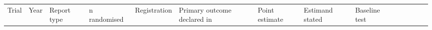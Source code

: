 {\def\LTcaptype{none} %
\begin{longtable}[]{@{}
  >{\raggedright\arraybackslash}p{}
  >{\raggedright\arraybackslash}p{}
  >{\raggedright\arraybackslash}p{}
  >{\raggedleft\arraybackslash}p{}
  >{\raggedright\arraybackslash}p{}
  >{\raggedright\arraybackslash}p{}
  >{\raggedright\arraybackslash}p{}
  >{\raggedright\arraybackslash}p{}
  >{\raggedright\arraybackslash}p{}
  >{\raggedright\arraybackslash}p{}
  >{\raggedright\arraybackslash}p{}
  >{\raggedright\arraybackslash}p{}
  >{\raggedright\arraybackslash}p{}
  >{\raggedright\arraybackslash}p{}@{}}
\toprule\noalign{}
\begin{minipage}[b]{\linewidth}\raggedright
Trial
\end{minipage} & \begin{minipage}[b]{\linewidth}\raggedright
Year
\end{minipage} & \begin{minipage}[b]{\linewidth}\raggedright
Report type
\end{minipage} & \begin{minipage}[b]{\linewidth}\raggedleft
n randomised
\end{minipage} & \begin{minipage}[b]{\linewidth}\raggedright
Registration
\end{minipage} & \begin{minipage}[b]{\linewidth}\raggedright
Primary outcome declared in
\end{minipage} & \begin{minipage}[b]{\linewidth}\raggedright
Point estimate
\end{minipage} & \begin{minipage}[b]{\linewidth}\raggedright
Estimand stated
\end{minipage} & \begin{minipage}[b]{\linewidth}\raggedright
Baseline test
\end{minipage} & \begin{minipage}[b]{\linewidth}\raggedright

\end{minipage}
\end{longtable}}
